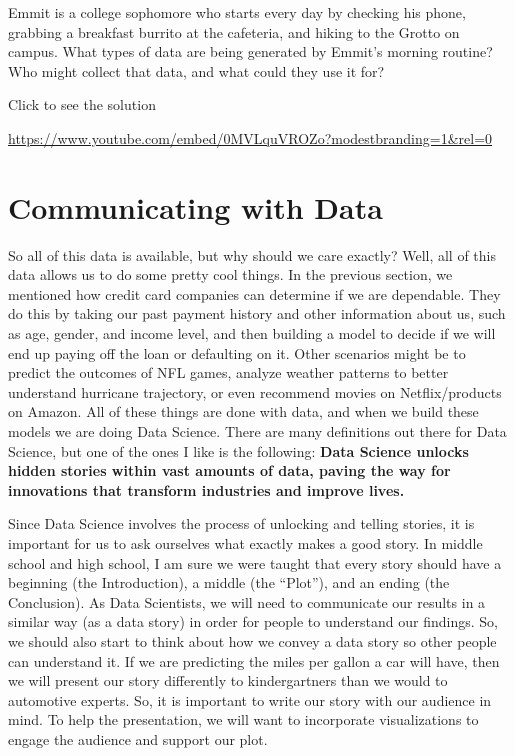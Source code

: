 \documentclass[
  letterpaper,
  DIV=11,
  numbers=noendperiod]{scrreprt}
\begin{document}
\begin{tcolorbox}[enhanced jigsaw, colframe=quarto-callout-tip-color-frame, colback=white, breakable, rightrule=.15mm, title=\textcolor{quarto-callout-tip-color}{\faLightbulb}\hspace{0.5em}{Try it Out}, bottomtitle=1mm, toptitle=1mm, titlerule=0mm, left=2mm, coltitle=black, colbacktitle=quarto-callout-tip-color!10!white, leftrule=.75mm, opacitybacktitle=0.6, bottomrule=.15mm, opacityback=0, arc=.35mm, toprule=.15mm]

Emmit is a college sophomore who starts every day by checking his phone,
grabbing a breakfast burrito at the cafeteria, and hiking to the Grotto
on campus. What types of data are being generated by Emmit's morning
routine? Who might collect that data, and what could they use it for?

Click to see the solution

\url{https://www.youtube.com/embed/0MVLquVROZo?modestbranding=1&rel=0}

\end{tcolorbox}

\section{Communicating with Data}\label{communicating-with-data}

So all of this data is available, but why should we care exactly? Well,
all of this data allows us to do some pretty cool things. In the
previous section, we mentioned how credit card companies can determine
if we are dependable. They do this by taking our past payment history
and other information about us, such as age, gender, and income level,
and then building a model to decide if we will end up paying off the
loan or defaulting on it. Other scenarios might be to predict the
outcomes of NFL games, analyze weather patterns to better understand
hurricane trajectory, or even recommend movies on Netflix/products on
Amazon. All of these things are done with data, and when we build these
models we are doing Data Science. There are many definitions out there
for Data Science, but one of the ones I like is the following:
\textbf{Data Science unlocks hidden stories within vast amounts of data,
paving the way for innovations that transform industries and improve
lives.}

Since Data Science involves the process of unlocking and telling
stories, it is important for us to ask ourselves what exactly makes a
good story. In middle school and high school, I am sure we were taught
that every story should have a beginning (the Introduction), a middle
(the ``Plot''), and an ending (the Conclusion). As Data Scientists, we
will need to communicate our results in a similar way (as a data story)
in order for people to understand our findings. So, we should also start
to think about how we convey a data story so other people can understand
it. If we are predicting the miles per gallon a car will have, then we
will present our story differently to kindergartners than we would to
automotive experts. So, it is important to write our story with our
audience in mind. To help the presentation, we will want to incorporate
visualizations to engage the audience and support our plot.
\end{document}
